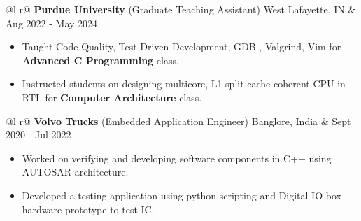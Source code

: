 \documentclass[a4paper,10pt]{article}
\begin{document}
\begin{tabularx}{\linewidth}{ @{}l r@{} }
    \textbf{Purdue University} (Graduate Teaching Assistant) West Lafayette, IN & \hfill {\small Aug 2022 - May 2024} \\[2.75pt]
    {
        \begin{minipage}[t]{\linewidth}
            \begin{itemize}[nosep,after=\strut, leftmargin=2em, itemsep=3pt]
                \item Taught Code Quality, Test-Driven Development, GDB , Valgrind, Vim for \textbf{Advanced C Programming} class.
                \item Instructed students on designing multicore, L1 split cache coherent CPU in RTL for \textbf{Computer Architecture} class.     
            \end{itemize}
        \end{minipage}
    }  
\end{tabularx}
\vspace{0.1cm}

\begin{tabularx}{\linewidth}{ @{}l r@{} }
    \textbf{Volvo Trucks} (Embedded Application Engineer) Banglore, India & \hfill {\small Sept 2020 - Jul 202}2 \\[2.75pt]
    {
        \begin{minipage}[t]{\linewidth}
            \begin{itemize}[nosep,after=\strut, leftmargin=2em, itemsep=3pt]
                \item Worked on verifying and developing software components in C++ using AUTOSAR architecture. %
                \item Developed a testing application using python scripting and Digital IO box hardware prototype to test IC.
            \end{itemize}
        \end{minipage}
    }
\end{tabularx}
\end{document}
